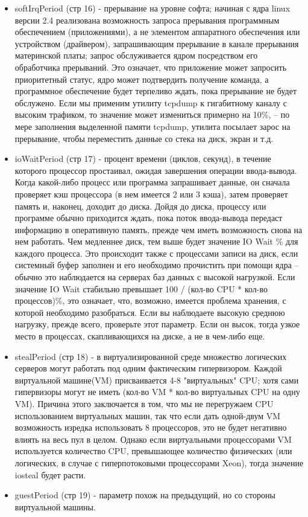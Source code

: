 \documentclass[a4paper, 12pt]{article}		%
\begin{document}
\begin{itemize}
\item softIrqPeriod (стр 16) - прерывание на уровне софта; начиная с ядра linux версии 2.4 реализована возможность запроса прерывания программным обеспечением (приложениями), а не элементом аппаратного обеспечения или устройством (драйвером), запрашивающим прерывание в канале прерывания материнской платы; запрос обслуживается ядром посредством его обработчика прерываний. Это означает, что приложение может запросить приоритетный статус, ядро может подтвердить получение команда, а программное обеспечение будет терпеливо ждать, пока прерывание не будет обслужено. Если мы применим утилиту tcpdump к гигабитному каналу с высоким трафиком, то значение может измениться примерно на 10\%, -- по мере заполнения выделенной памяти tcpdump, утилита посылает зарос на прерывание, чтобы переместить данные со стека на диск, экран и т.д. 
\item ioWaitPeriod (стр 17) - процент времени (циклов, секунд), в течение которого процессор простаивал, ожидая завершения операции ввода-вывода. Когда какой-либо процесс или программа запрашивает данные, он сначала проверяет кэш процессора (в нем имеется 2 или 3 кэша), затем проверяет память и, наконец, доходит до диска. Дойдя до диска, процессу или программе обычно приходится ждать, пока поток ввода-вывода передаст информацию в оперативную память, прежде чем иметь возможность снова на нем работать. Чем медленнее диск, тем выше будет значение IO Wait \% для каждого процесса. Это происходит также с процессами записи на диск, если системный буфер заполнен и его необходимо прочистить при помощи ядра – обычно это наблюдается на серверах баз данных с высокой нагрузкой. Если значение IO Wait стабильно превышает {100 / (кол-во CPU * кол-во процессов)}\%, это означает, что, возможно, имеется проблема хранения, с которой необходимо разобраться. Если вы наблюдаете высокую среднюю нагрузку, прежде всего, проверьте этот параметр. Если он высок, тогда узкое место в процессах, скапливающихся на диске, а не в чем-либо еще.
\item stealPeriod (стр 18) - в виртуализированной среде множество логических серверов могут работать под одним фактическим гипервизором. Каждой виртуальной машине(VM) присваивается 4-8 "виртуальных" CPU; хотя сами гипервизоры могут не иметь (кол-во VM * кол-во виртуальных CPU на одну VM). Причина этого заключается в том, что мы не перегружаем CPU использованием виртуальных машин, так что если дать одной-двум VM возможность изредка использовать 8 процессоров, это не будет негативно влиять на весь пул в целом. Однако если виртуальными процессорами VM используется количество CPU, превышающее количество физических (или логических, в случае с гиперпотоковыми процессорами Xeon), тогда значение iosteal будет расти.
\item guestPeriod (стр 19) - параметр похож на предыдущий, но со стороны виртуальной машины.
\end{itemize}
\end{document}
